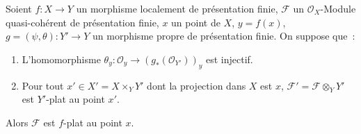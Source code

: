 \begin{proposition}[11.5.3]
\label{IV.11.5.3-fr}
Soient $f:X\to Y$ un morphisme localement de présentation finie,
$\mathcal F$ un $\mathcal O_X$-Module quasi-cohérent de présentation finie, $x$
un point de $X$, $y=f(x)$, $g=(\psi,\theta):Y'\to Y$ un morphisme \textup{propre} de
présentation finie. On suppose que~:
\begin{enumerate}[label=\textup{(\roman*)}]
  \item L'homomorphisme $\theta_y:\mathcal O_y\to
  (g_*(\mathcal O_{Y'}))_y$ est injectif.
  \item Pour tout $x'\in X'=X\times_Y Y'$ dont la projection dans $X$ est $x$,
  $\mathcal F'=\mathcal F\otimes_Y Y'$ est $Y'$-plat au point $x'$.
\end{enumerate}

Alors $\mathcal F$ est $f$-plat au point $x$.
\end{proposition}

